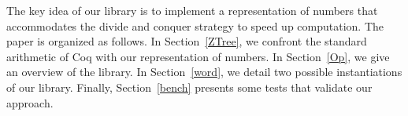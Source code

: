 The key idea of our library is to implement a representation of numbers that accommodates the divide and
conquer strategy to speed up computation. The paper is organized as follows. 
In Section~\ref{ZTree}, we confront the standard arithmetic of {\sc Coq} with
our representation of numbers. In Section~\ref{Op}, we give an overview of the library.  
In Section~\ref{word}, we detail two possible instantiations of our library.
Finally, Section~\ref{bench} presents some tests that validate our approach.
 
